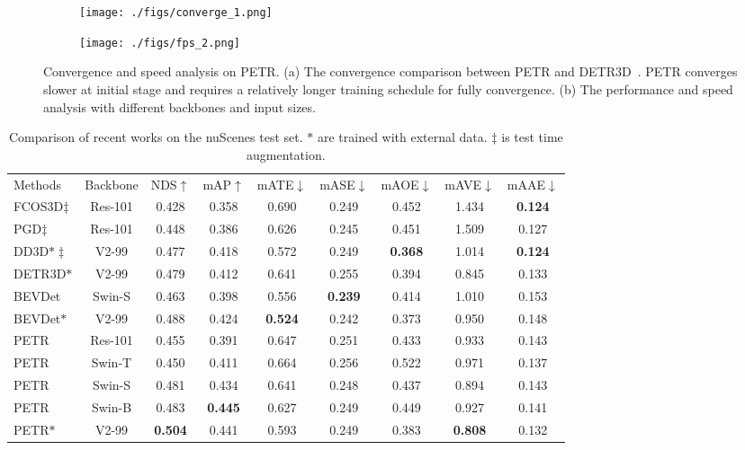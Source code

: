 \documentclass[runningheads]{llncs}
\begin{document}
\begin{figure*}[t]
	\centering  
	\begin{subfigure}{.49\textwidth}
			\centering
			\texttt{[image: ./figs/converge\_1.png]}
			\caption{}
		\end{subfigure}
	\begin{subfigure}{.49\textwidth}
			\centering
			\texttt{[image: ./figs/fps\_2.png]}
			\caption{}
		\end{subfigure}
	\caption{Convergence and speed analysis on PETR. (a) The convergence comparison between PETR and DETR3D~\cite{wang2022detr3d}. PETR converges slower at initial stage and requires a relatively longer training schedule for fully convergence. (b) The performance and speed analysis with different backbones and input sizes. }
	\label{analysis}
\end{figure*}
\begin{table}[t!]
\begin{center}
\caption{Comparison of recent works on the nuScenes test set. $\ast$ are trained with external data.  $\ddagger$ is test time augmentation. }
\label{table:2}
\begin{tabular}{l|c|ccccccc}
\hline\noalign{\smallskip}
Methods & Backbone & NDS$\uparrow$ & mAP$\uparrow$ & mATE$\downarrow$ & mASE$\downarrow$ & mAOE$\downarrow$ & mAVE$\downarrow$ & mAAE$\downarrow$ \\

\noalign{\smallskip}
\hline
\noalign{\smallskip}
FCOS3D$\ddagger$ & Res-101 &0.428 &0.358 &0.690 &0.249 &0.452 &1.434 &\textbf{0.124}  \\
 PGD$\ddagger$ & Res-101 &0.448 &0.386 &0.626 &0.245 &0.451 &1.509 &0.127  \\
 DD3D$\ast\ddagger$ & V2-99 &0.477 &0.418  &0.572 &0.249 &\textbf{0.368} &1.014 &\textbf{0.124}  \\
 DETR3D$\ast$ & V2-99 &0.479 &0.412  &0.641 &0.255 &0.394 &0.845 &0.133  \\
 BEVDet & Swin-S &0.463 &0.398 &0.556 &\textbf{0.239} &0.414 &1.010 &0.153  \\
 BEVDet$\ast$ & V2-99 &0.488 &0.424 &\textbf{0.524} &0.242 &0.373 &0.950 &0.148  \\
\hline
PETR & Res-101 &0.455 &0.391 &0.647 &0.251 &0.433 &0.933 &0.143 \\
PETR & Swin-T &0.450 &0.411 &0.664 &0.256 &0.522 &0.971 &0.137\\
PETR & Swin-S &0.481 &0.434 &0.641 &0.248 &0.437 &0.894 &0.143\\
PETR & Swin-B &0.483 &\textbf{0.445} &0.627 &0.249 &0.449 &0.927 &0.141\\					
PETR$\ast$ & V2-99 &\textbf{0.504} &0.441 &0.593 &0.249 &0.383 &\textbf{0.808} &0.132  \\
\hline
\end{tabular}
\end{center}
\end{table}
\end{document}
